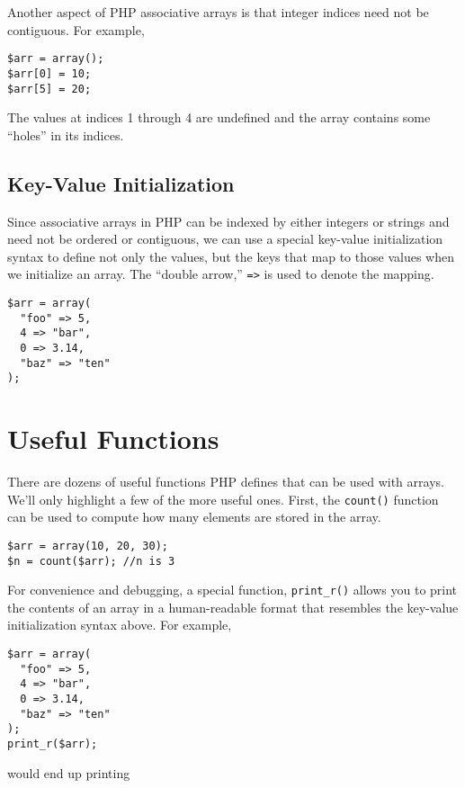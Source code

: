 Another aspect of PHP associative arrays is that integer indices 
need not be contiguous.  For example,

\begin{verbatim}
$arr = array();
$arr[0] = 10;
$arr[5] = 20;
\end{verbatim}

The values at indices 1 through 4 are undefined and the
array contains some ``holes'' in its indices.  

\subsection{Key-Value Initialization}

Since associative arrays in PHP can be indexed by
either integers or strings and need not be ordered or
contiguous, we can use a special key-value initialization
syntax to define not only the values, but the keys that
map to those values when we initialize an array.  The
``double arrow,'' \texttt{=>} is used to denote
the mapping.

\begin{verbatim}
$arr = array(
  "foo" => 5,
  4 => "bar",
  0 => 3.14,
  "baz" => "ten"
);
\end{verbatim}

\section{Useful Functions}

There are dozens of useful functions PHP defines that can
be used with arrays.  We'll only highlight a few of the more
useful ones.  First, the \texttt{count()} function 
can be used to
compute how many elements are stored in the array.

\begin{verbatim}
$arr = array(10, 20, 30);
$n = count($arr); //n is 3
\end{verbatim}

For convenience and debugging, a special function, 
\texttt{print_r()} allows you to print the
contents of an array in a human-readable format 
that resembles the key-value initialization syntax
above.  For example, 

\begin{verbatim}
$arr = array(
  "foo" => 5,
  4 => "bar",
  0 => 3.14,
  "baz" => "ten"
);
print_r($arr);  
\end{verbatim}

would end up printing

